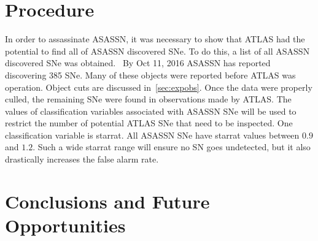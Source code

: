 \documentclass[aps,prb,twocolumn,superscriptaddress]{revtex4-1}
\begin{document}
\section{Procedure}

\indent In order to assassinate ASASSN, it was necessary to show that ATLAS 
had the potential to find all of ASASSN discovered SNe.  
To do this, a list of all ASASSN discovered SNe was obtained.~\cite{asn_data}  
By Oct 11, 2016 ASASSN has reported discovering 385 SNe. Many of these 
objects were reported before ATLAS was operation. Object cuts are discussed 
in~\cref{sec:expobs}. Once the data were properly culled, the remaining SNe 
were found in observations made by ATLAS.  
%
The values of classification variables 
associated with ASASSN SNe will be used to 
restrict the number of potential ATLAS SNe that need to be inspected.  One 
classification variable is starrat.  All ASASSN SNe have starrat values 
between $0.9$ and $1.2$.  Such a wide starrat range will ensure no SN goes 
undetected, but it also drastically increases the false alarm rate.
%





\section{Conclusions and Future Opportunities}
\end{document}
